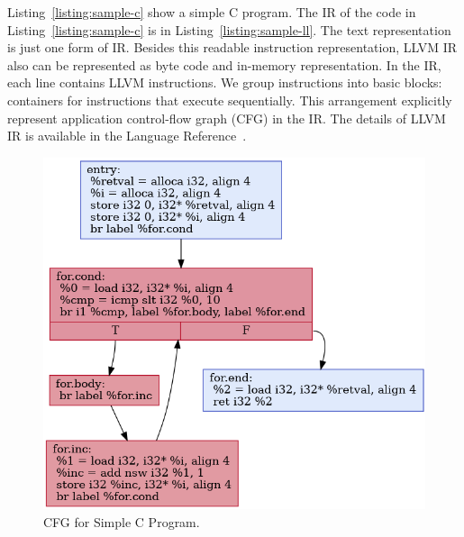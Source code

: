 
Listing~\ref{listing:sample-c} show a simple C program. The IR of the code in
Listing~\ref{listing:sample-c} is in Listing~\ref{listing:sample-ll}. The text
representation is just one form of IR. Besides this readable instruction
representation, LLVM IR also can be represented as byte code and in-memory
representation. In the IR, each line contains LLVM instructions. We group
instructions into basic blocks: containers for instructions that execute
sequentially. This arrangement explicitly represent application control-flow
graph (CFG) in the IR. The details of LLVM IR is available in the Language
Reference~\cite{LLVMLanguageReferencea}.



\begin{figure}[ht]
    \centerline{\includegraphics[scale=.75]{Figures/03/cfg.png}}
    \caption{CFG for Simple C Program.}
    \label{fig:cfg}
\end{figure}


